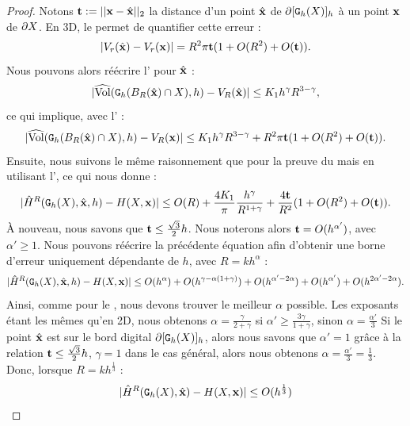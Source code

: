 %
\begin{proof}
%
Notons $\vt \EqDef ||\vx-\vxH||_2$ la distance d'un point $\vxH$ de
$\Bd{\Body{\DSh}{h}}$ à un point $\vx$ de $\dS$. En 3D, le
 permet de quantifier cette erreur :
%
\begin{equation}\label{eq:volume-shift-error}
  | V_r(\vxH) - V_r(\vx) | = R^2 \pi \vt (1 + O(R^2)+O(\vt)).
\end{equation}
%
Nous pouvons alors réécrire l'
pour $\vxH$ :
%
\begin{equation}
  | \VolC(\DigF{\Ball{R}{\vxH} \cap \Shape}{h}, h) - V_R(\vxH) | \le K_1 h^\gamma R^{3-\gamma},
\end{equation}
%
ce qui implique, avec l' :
%
\begin{equation}\label{eq:shift-B-R-error-bound-3D}
  | \VolC(\DigF{\Ball{R}{\vxH} \cap \Shape}{h}, h) - V_R(\vx) |  \le K_1 h^\gamma R^{3-\gamma} +  R^2 \pi \vt (1 + O(R^2) + O(\vt)).
\end{equation}
%
Ensuite, nous suivons le même raisonnement que pour la preuve du
 mais en utilisant
l', ce qui nous donne :
%
\begin{equation}\label{eq:shift-curvhat-error-bound-3D}
  | \MeanCurvH{R}(\DSh,\vxH,h) - \MeanCurv(\Shape,\vx) | \le O(R) + \frac{4 K_1}{\pi} \frac{h^\gamma}{R^{1+\gamma}} + \frac{4 \vt}{R^2}(1 + O(R^2) + O(\vt)).
\end{equation}
%
À nouveau, nous savons que $\vt \le \frac{\sqrt{3}}{2}h$. Nous noterons alors
$\vt = O(h^{\alpha'})$, avec $\alpha' \ge 1$. Nous pouvons réécrire la
précédente équation afin d'obtenir une borne d'erreur uniquement dépendante de
$h$, avec $R=kh^{\alpha}$ :
%
\begin{equation} \label{eq:shift-meancurvhat-error-bound-h-only}
  | \MeanCurvH{R}(\DSh,\vxH,h) - \MeanCurv(\Shape,\vx) |
  \le O(h^\alpha) + O(h^{\gamma-\alpha(1+\gamma)}) + O(h^{\alpha'-2\alpha})
    + O(h^{\alpha'}) + O(h^{2\alpha'-2\alpha}).
\end{equation}
%
Ainsi, comme pour le , nous devons trouver
le meilleur $\alpha$ possible. Les exposants étant les mêmes qu'en 2D, nous
obtenons $\alpha = \frac{\gamma}{2 + \gamma}$ si $\alpha' \ge \frac{3 \gamma}{1 +
\gamma}$, sinon $\alpha = \frac{\alpha'}{3}$
%
Si le point $\vxH$ est sur le bord digital $\Bd{\Body{\DSh}{h}}$, alors nous
savons que $\alpha'=1$ grâce à la relation $\vt \le \frac{\sqrt{3}}{2}h$, $\gamma =
1$ dans le cas général, alors nous obtenons $\alpha = \frac{\alpha'}{3} =
\frac{1}{3}$. Donc, lorsque $R = kh^{\frac{1}{3}}$ :
%
\begin{equation}
  | \MeanCurvH{R}(\DSh,\vxH) - \MeanCurv(\Shape,\vx) | \le O(h^{\frac{1}{3}})
\end{equation}
%
\end{proof}
%
